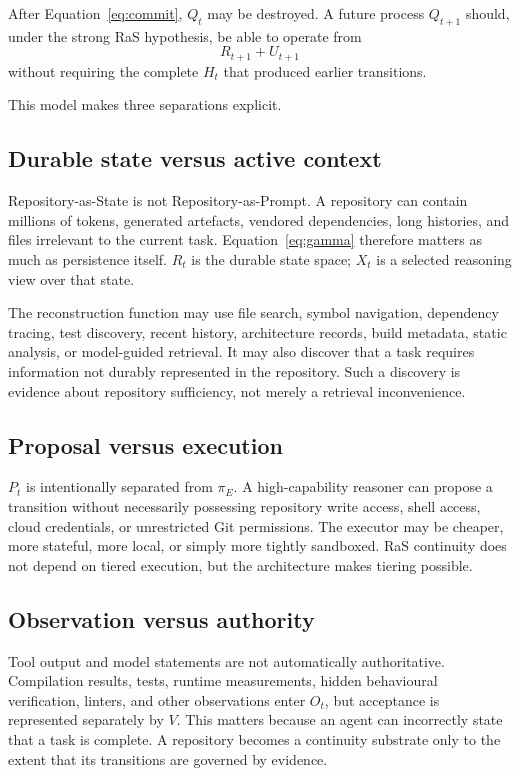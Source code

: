 After Equation~\ref{eq:commit}, $Q_t$ may be destroyed. A future process $Q_{t+1}$ should, under the strong RaS hypothesis, be able to operate from
\begin{equation}
R_{t+1}+U_{t+1}
\end{equation}
without requiring the complete $H_t$ that produced earlier transitions.

This model makes three separations explicit.

\subsection{Durable state versus active context}

Repository-as-State is not Repository-as-Prompt. A repository can contain millions of tokens, generated artefacts, vendored dependencies, long histories, and files irrelevant to the current task. Equation~\ref{eq:gamma} therefore matters as much as persistence itself. $R_t$ is the durable state space; $X_t$ is a selected reasoning view over that state.

The reconstruction function may use file search, symbol navigation, dependency tracing, test discovery, recent history, architecture records, build metadata, static analysis, or model-guided retrieval. It may also discover that a task requires information not durably represented in the repository. Such a discovery is evidence about repository sufficiency, not merely a retrieval inconvenience.

\subsection{Proposal versus execution}

$P_t$ is intentionally separated from $\pi_E$. A high-capability reasoner can propose a transition without necessarily possessing repository write access, shell access, cloud credentials, or unrestricted Git permissions. The executor may be cheaper, more stateful, more local, or simply more tightly sandboxed. RaS continuity does not depend on tiered execution, but the architecture makes tiering possible.

\subsection{Observation versus authority}

Tool output and model statements are not automatically authoritative. Compilation results, tests, runtime measurements, hidden behavioural verification, linters, and other observations enter $O_t$, but acceptance is represented separately by $V$. This matters because an agent can incorrectly state that a task is complete. A repository becomes a continuity substrate only to the extent that its transitions are governed by evidence.

